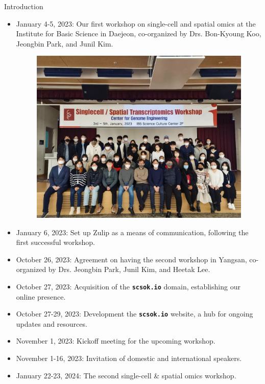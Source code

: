 \begin{coverpage}{Introduction}
{\begin{itemize}[leftmargin=0.5cm, rightmargin=0.5cm]
\item January 4-5, 2023: Our first workshop on single-cell and spatial omics at the Institute for Basic Science in Daejeon, co-organized by Drs. Bon-Kyoung Koo, Jeongbin Park, and Junil Kim.
\begin{figure}[h!]
\vspace{3mm}
\includegraphics[width=\textwidth]{images/1st-workshop.jpg}
\centering
\end{figure}
\item January 6, 2023: Set up Zulip as a means of communication, following the first successful workshop.
\item October 26, 2023: Agreement on having the second workshop in Yangsan, co-organized by Drs. Jeongbin Park, Junil Kim, and Heetak Lee.
\item October 27, 2023: Acquisition of the \textbf{\texttt{scsok.io}} domain, establishing our online presence.
\item October 27-29, 2023: Development the \textbf{\texttt{scsok.io}} website, a hub for ongoing updates and resources.
\item November 1, 2023: Kickoff meeting for the upcoming workshop.
\item November 1-16, 2023: Invitation of domestic and international speakers.
\item January 22-23, 2024: The second single-cell \& spatial omics workshop.
\end{itemize}

}
\end{coverpage}
